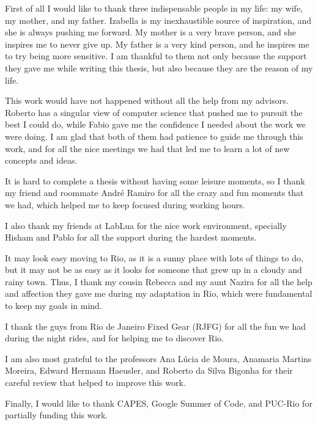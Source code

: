 First of all I would like to thank three indispensable people in my life:
my wife, my mother, and my father.
Izabella is my inexhaustible source of inspiration, and she is
always pushing me forward.
My mother is a very brave person, and she inspires me to never give up.
My father is a very kind person, and he inspires me to try being more sensitive.
I am thankful to them not only because the support they gave me while
writing this thesis, but also because they are the reason of my life.

This work would have not happened without all the help from my advisors.
Roberto has a singular view of computer science that pushed me to
pursuit the best I could do, while Fabio gave me the confidence I
needed about the work we were doing.
I am glad that both of them had patience to guide me through this
work, and for all the nice meetings we had that led me to learn
a lot of new concepts and ideas.

It is hard to complete a thesis without having some leisure moments,
so I thank my friend and roommate André Ramiro for all the crazy and
fun moments that we had, which helped me to keep focused during working hours.

I also thank my friends at LabLua for the nice work environment,
specially Hisham and Pablo for all the support during the
hardest moments.

It may look easy moving to Rio, as it is a sunny place with lots
of things to do, but it may not be as easy as it looks for
someone that grew up in a cloudy and rainy town.
Thus, I thank my cousin Rebecca and my aunt Nazira for all the help
and affection they gave me during my adaptation in Rio, which
were fundamental to keep my goals in mind.

I thank the guys from Rio de Janeiro Fixed Gear (RJFG) for all
the fun we had during the night rides, and for helping me to discover Rio.

I am also most grateful to the professors Ana Lúcia de Moura,
Anamaria Martins Moreira, Edward Hermann Haeusler, and
Roberto da Silva Bigonha for their careful review that helped
to improve this work.

Finally, I would like to thank CAPES, Google Summer of Code, and PUC-Rio
for partially funding this work.
